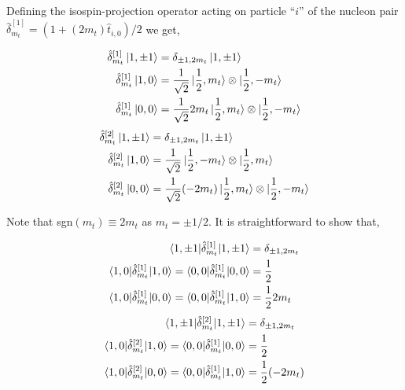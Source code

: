 \documentclass[10pt]{article}
\begin{document}
Defining the isospin-projection operator acting on particle ``$i$'' of the nucleon pair $ \hat{\delta}_{m_t}^{[1]} = ( 1 + (2 m_t) \hat{t}_{i,0})/2$ we get,
\begin{multicols}{2}
\noindent
\begin{align*}
	\hat{\delta}_{m_t}^{[1]} \ket{ 1, \pm 1} &= \delta_{\pm 1,2m_t}  \ket{ 1, \pm 1}  \\
	\hat{\delta}_{m_t}^{[1]} \ket{ 1,0} &= \frac{1}{\sqrt{2}} \ket{ \frac{1}{2}, m_t} \otimes \ket{ \frac{1}{2}, -m_t} \\
	\hat{\delta}_{m_t}^{[1]} \ket{ 0,0} &= \frac{1}{\sqrt{2}} 2 m_t \ket{ \frac{1}{2}, m_t} \otimes \ket{ \frac{1}{2}, -m_t}
\end{align*}
\begin{align*}
	\hat{\delta}_{m_t}^{[2]} \ket{ 1, \pm 1} &= \delta_{\pm 1,2m_t}  \ket{ 1, \pm 1}  \\
	\hat{\delta}_{m_t}^{[2]} \ket{ 1,0} &= \frac{1}{\sqrt{2}} \ket{ \frac{1}{2}, -m_t} \otimes \ket{ \frac{1}{2}, m_t} \\
	\hat{\delta}_{m_t}^{[2]} \ket{ 0,0} &= \frac{1}{\sqrt{2}} (-2 m_t) \ket{ \frac{1}{2}, m_t} \otimes \ket{ \frac{1}{2}, -m_t}
\end{align*}
\end{multicols}
Note that sgn$(m_t) \equiv 2m_t$ as $m_t = \pm 1/2$.
It is straightforward to show that,
\begin{multicols}{2}
\noindent
\begin{align*}
	\braket{ 1, \pm 1 | \hat{\delta}_{m_t}^{[1]} | 1, \pm 1} &= \delta_{\pm 1,2m_t}  \\
	\braket{ 1,0 | \hat{\delta}_{m_t}^{[1]} | 1,0} = \braket{ 0,0 | \hat{\delta}_{m_t}^{[1]} | 0,0} &=  \frac{1}{2} \\
	\braket{ 1,0 | \hat{\delta}_{m_t}^{[1]} | 0,0} = \braket{ 0,0 | \hat{\delta}_{m_t}^{[1]} | 1,0} &=  \frac{1}{2} 2 m_t
\end{align*}
\begin{align*}
	\braket{ 1, \pm 1 | \hat{\delta}_{m_t}^{[2]} | 1, \pm 1} &= \delta_{\pm 1,2m_t}  \\
	\braket{ 1,0 | \hat{\delta}_{m_t}^{[2]} | 1,0} = \braket{ 0,0 | \hat{\delta}_{m_t}^{[1]} | 0,0} &=  \frac{1}{2} \\
	\braket{ 1,0 | \hat{\delta}_{m_t}^{[2]} | 0,0} = \braket{ 0,0 | \hat{\delta}_{m_t}^{[1]} | 1,0} &=  \frac{1}{2} (-2 m_t) 
\end{align*}
\end{multicols}
\end{document}
